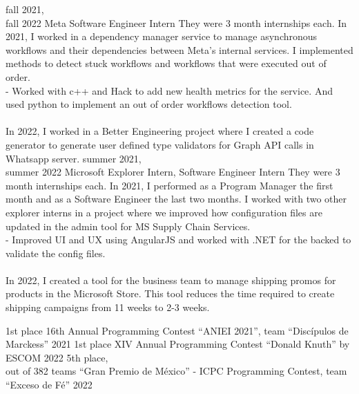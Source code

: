 \documentclass[9pt]{developercv} %
\begin{document}
\begin{entrylist}
    \entry
        {fall 2021,\\fall 2022}
        {Meta}
        {Software Engineer Intern}
        {They were 3 month internships each.
        In 2021, I worked in a dependency manager service to manage asynchronous workflows and their dependencies between Meta's internal services. I implemented methods to detect stuck workflows and workflows that were executed out of order.\\
		- Worked with c++ and Hack to add new health metrics for the service. And used python to implement an out of order workflows detection tool.\\\\
        In 2022, I worked in a Better Engineering project where I created a code generator to generate user defined type validators for Graph API calls in Whatsapp server.}
	\entry
		{summer 2021,\\summer 2022}
		{Microsoft}
		{Explorer Intern, Software Engineer Intern}
		{They were 3 month internships each.
        In 2021, I performed as a Program Manager the first month and as a Software Engineer the last two months. I worked with two other explorer interns in a project where we improved how configuration files are updated in the admin tool for MS Supply Chain Services.\\
		- Improved UI and UX using AngularJS and worked with .NET for the backed to validate the config files.\\\\
        In 2022, I created a tool for the business team to manage shipping promos for products in the Microsoft Store. This tool reduces the time required to create shipping campaigns from 11 weeks to 2-3 weeks.}
\end{entrylist}



\begin{entrylist}
	\entry
		{1st place}
		{16th Annual Programming Contest ``ANIEI 2021'', team ``Discípulos de Marckess''}
		{2021}
		{}
	\entry
		{1st place}
		{XIV Annual Programming Contest ``Donald Knuth'' by ESCOM}
		{2022}
		{}
	\entry
		{5th place,\\out of 382 teams}
		{``Gran Premio de México'' - ICPC Programming Contest, team ``Exceso de Fé''}
		{2022}
		{}
\end{entrylist}
\end{document}
